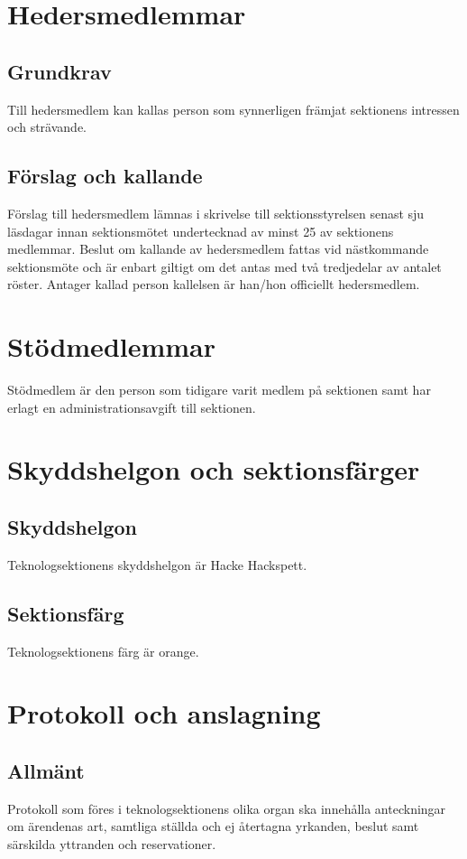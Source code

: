 \documentclass[a4paper]{dtek}
\begin{document}
\section{Hedersmedlemmar}
\subsection{Grundkrav}
Till hedersmedlem kan kallas person som synnerligen främjat sektionens intressen och strävande.
\subsection{Förslag och kallande}
Förslag till hedersmedlem lämnas i skrivelse till sektionsstyrelsen senast sju läsdagar innan sektionsmötet undertecknad av minst 25 av sektionens medlemmar. Beslut om kallande av hedersmedlem fattas vid nästkommande sektionsmöte och är enbart giltigt om det antas med två tredjedelar av antalet röster. Antager kallad person kallelsen är han/hon officiellt hedersmedlem.
\newpage

\section{Stödmedlemmar}
Stödmedlem är den person som tidigare varit medlem på sektionen samt har erlagt en administrationsavgift till sektionen.
\newpage

\section{Skyddshelgon och sektionsfärger}
\subsection{Skyddshelgon}
Teknologsektionens skyddshelgon är Hacke Hackspett.
\subsection{Sektionsfärg}
Teknologsektionens färg är orange.
\newpage

\section{Protokoll och anslagning}
\subsection{Allmänt}
Protokoll som föres i teknologsektionens olika organ ska innehålla anteckningar om ärendenas art, samtliga ställda och ej återtagna yrkanden, beslut samt särskilda yttranden och reservationer.
\end{document}
